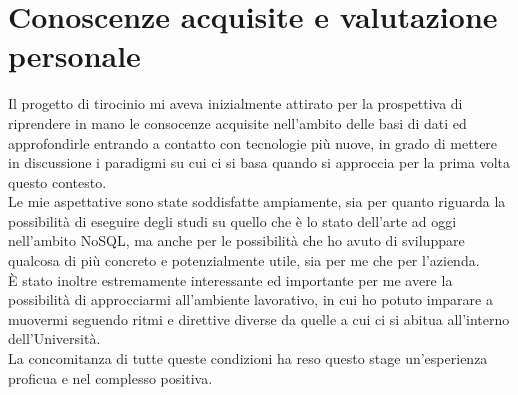\section{Conoscenze acquisite e valutazione personale}
Il progetto di tirocinio mi aveva inizialmente attirato per la prospettiva di riprendere in mano le consocenze acquisite nell'ambito delle basi di dati ed approfondirle entrando a contatto con tecnologie più nuove, in grado di mettere in discussione i paradigmi su cui ci si basa quando si approccia per la prima volta questo contesto.\\

\noindent Le mie aspettative sono state soddisfatte ampiamente, sia per quanto riguarda la possibilità di eseguire degli studi su quello che è lo stato dell'arte ad oggi nell'ambito NoSQL, ma anche per le possibilità che ho avuto di sviluppare qualcosa di più concreto e potenzialmente utile, sia per me che per l'azienda.\\

\noindent È stato inoltre estremamente interessante ed importante per me avere la possibilità di approcciarmi all'ambiente lavorativo, in cui ho potuto imparare a muovermi seguendo ritmi e direttive diverse da quelle a cui ci si abitua all'interno dell'Università.\\

\noindent La concomitanza di tutte queste condizioni ha reso questo stage un'esperienza proficua e nel complesso positiva.\\
